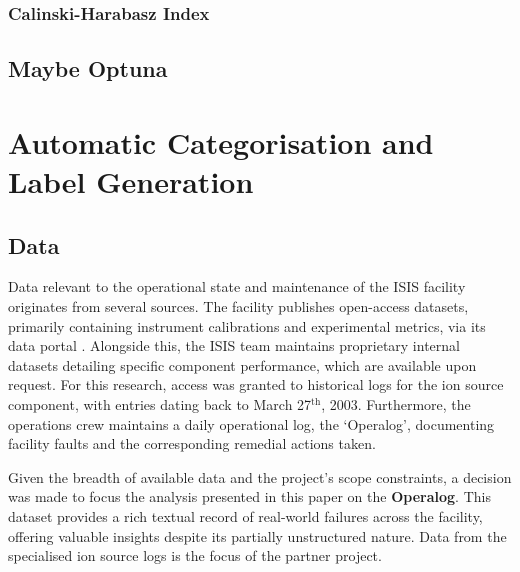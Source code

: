 \documentclass[10pt,oneside]{report}
\begin{document}
\subsection{Calinski-Harabasz Index}

\section{Maybe Optuna}

\chapter{Automatic Categorisation and Label Generation}\label{chap:Methodology}

\section{Data}

Data relevant to the operational state and maintenance of the ISIS facility originates from several sources. The facility publishes open-access datasets, primarily containing instrument calibrations and experimental metrics, via its data portal \citep{isisdata}. Alongside this, the ISIS team maintains proprietary internal datasets detailing specific component performance, which are available upon request. For this research, access was granted to historical logs for the ion source component, with entries dating back to March 27$^\text{th}$, 2003. Furthermore, the operations crew maintains a daily operational log, the `Operalog', documenting facility faults and the corresponding remedial actions taken.

Given the breadth of available data and the project's scope constraints, a decision was made to focus the analysis presented in this paper on the \textbf{Operalog}. This dataset provides a rich textual record of real-world failures across the facility, offering valuable insights despite its partially unstructured nature. Data from the specialised ion source logs is the focus of the partner project. 
\end{document}
